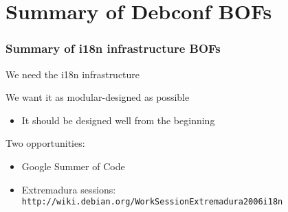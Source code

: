 \documentclass{beamer}
\begin{document}
\section{Summary of Debconf BOFs}


\begin{frame}
  \frametitle{Summary of i18n infrastructure BOFs}
	\begin{block}
		{We need the i18n infrastructure}
	\end{block}
	\begin{block}
		{We want it as modular-designed as possible}
	\begin{itemize}
	\item
		{It should be designed well from the beginning}
	\end{itemize}
	\end{block}
	\begin{block}
		{Two opportunities:}
	\begin{itemize}
	\item
		{Google Summer of Code}
	\item
		{Extremadura sessions: \tiny{\texttt{http://wiki.debian.org/WorkSessionExtremadura2006i18n}}}
	\end{itemize}
	\end{block}
\end{frame}
\end{document}
